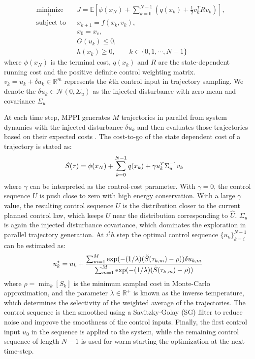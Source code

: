 \documentclass[english]{cccconf}
\begin{document}
\begin{equation}\label{eq:mpc_optimization}
    \begin{aligned}
         &\underset{\mathbb{U}}{\text{minimize}} && J= \mathbb{E}[\phi(x_N)+\sum_{k=0}^{N-1}(q(x_k)+\frac{1}{2}v_k^TRv_k)], \\
         &\text{subject to}&&  
    x_{k+1} = f(x_k, v_k), \\
         & && x_0 = x_c, \\
        & && G(u_k) \leq 0, \\
        & && h(x_k) \geq 0, \qquad k\in \{0,1,\cdots,N-1\}
    \end{aligned}
\end{equation}
where $\phi(x_N)$ is the terminal cost, $q(x_k)$ and 
$R$ are the state-dependent running cost and the positive definite control weighting matrix. $v_k = u_k + \delta u_k \in \mathbb{R}^m$ represents the $k$th control input in trajectory sampling. We denote the $\delta u_k \in \mathcal{N}(0, \Sigma_u)$ as the injected disturbance with zero mean and covariance $\Sigma_u$

At each time step, MPPI generates $M$ trajectories in parallel from system dynamics with the injected disturbance  $\delta u_k$ and then evaluates those trajectories based on their expected costs \cite{williams2015model}. The cost-to-go of the state dependent cost of a trajectory is stated as:
\begin{equation}\label{eq:cost-to-go}
\begin{aligned}
    &\Tilde{S}(\tau) = \phi(x_N) + \sum_{k=0}^{N-1} q(x_k)+\gamma u_{k}^T \Sigma_u^{-1} v_k
\end{aligned}
\end{equation}
where $\gamma$ can be interpreted as the control-cost parameter. With $\gamma = 0$, the control sequence \(U\) is push close to zero with high energy conservation. With a large $\gamma$ value, the resulting control sequence \(U\) is the distribution closer to the current planned control law, which keeps \(U\) near the distribution corresponding to \(\hat{U}\). $\Sigma_u$ is again the injected disturbance covariance, which dominates the exploration in parallel trajectory generation.
At $i^th$ step the optimal control sequence $\{u_k\}^{N-1}_{k=i}$ can be estimated as\cite{williams2017model}:
\begin{equation}\label{eq:u_with_rho}
u_k^* = u_k + \frac{\sum_{m=1}^{M}\exp(-(1/\lambda)(\Tilde{S}(\tau_{k,m})-\rho))\delta u_{k,m}}{\sum_{m=1}^{M}\exp(-(1/\lambda)(\Tilde{S}(\tau_{k,m})-\rho))}
\end{equation}
where $\rho = \min_{k} [S_k]$ is the minimum sampled cost in Monte-Carlo approximation, and the parameter $\lambda \in \mathbb{R}^+$
is known as the inverse temperature, which determines the selectivity of the weighted average of the trajectories. The control sequence is then smoothed using a Savitzky-Golay (SG) filter to reduce noise and improve the smoothness of the control inputs. Finally, the first control input $u_0$ in the sequence is applied to the system, while the remaining control sequence of length $N-1$ is used for warm-starting the optimization at the next time-step. 
\end{document}
